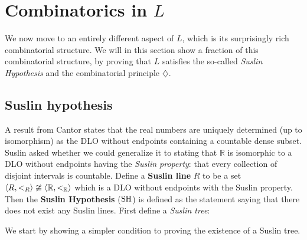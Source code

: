 \chapter{Combinatorics in $L$}
\thispagestyle{fancy}

We now move to an entirely different aspect of $L$, which is its surprisingly rich combinatorial structure. We will in this section show a fraction of this combinatorial structure, by proving that $L$ satisfies the so-called \textit{Suslin Hypothesis} and the combinatorial principle $\diamondsuit$.\\

\section{Suslin hypothesis}
A result from Cantor states that the real numbers are uniquely determined (up to isomorphism) as the DLO without endpoints containing a countable dense subset. Suslin asked whether we could generalize it to stating that $\mathbb{R}$ is isomorphic to a DLO without endpoints having the \textit{Suslin property}: that every collection of disjoint intervals is countable. Define a \textbf{Suslin line} $R$ to be a set $\langle R,<_R\rangle\ncong\langle \mathbb{R},<_{\mathbb{R}}\rangle$ which is a DLO without endpoints with the Suslin property. Then the \textbf{Suslin Hypothesis} ($\operatorname{SH}$) is defined as the statement saying that there does not exist any Suslin lines. First define a \textit{Suslin tree}:


We start by showing a simpler condition to proving the existence of a Suslin tree.

